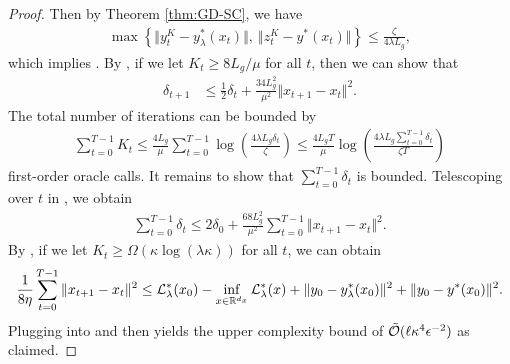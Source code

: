 \begin{proof}
Then by Theorem \ref{thm:GD-SC}, we have
\begin{align} \label{eq:induction}
     \max \left\{ \Vert y_t^K - y_{\lambda}^*(x_t) \Vert , ~\Vert z_t^K-  y^*(x_t) \Vert   \right\} \le \frac{\zeta}{4 \lambda L_g},
\end{align}
which implies . 
By , if we let $K_t \ge 8L_g/\mu$ for all $t$, then we can show that
\begin{align}  \label{eq:dekta-recur}
     \delta_{t+1}
    &\le \frac{1}{2} \delta_t +\frac{34 L_g^2}{\mu^2} \Vert x_{t+1} - x_t \Vert^2.
\end{align}
The total number of iterations can be bounded by
\begin{align} \label{plug:2}
\sum_{t=0}^{T-1} K_t \le \frac{4L_g}{\mu} \sum_{t=0}^{T-1} \log \left( 
\frac{4 \lambda L_g \delta_t}{\zeta}
\right)   \le \frac{4L_g T}{\mu} \log \left( \frac{4 \lambda L_g \sum_{t=0}^{T-1}\delta_t}{\zeta T} \right)
\end{align}
 first-order oracle calls. It remains to show that $\sum_{t=0}^{T-1} \delta_t$ is bounded.
Telescoping over $t$ in , we obtain
\begin{align} \label{plug:1}
    \sum_{t=0}^{T-1} \delta_{t} \le 2 \delta_0 + \frac{68L_g^2}{\mu^2} \sum_{t=0}^{T-1} \Vert x_{t+1} - x_t \Vert^2.
\end{align}
By , if we let $K_t \ge \Omega( \kappa \log(\lambda \kappa))$ for all $t$, we can obtain
\begin{align*}
\frac{1}{8 \eta} \sum_{t=0}^{T-1} \Vert x_{t+1} - x_t \Vert^2 \le {\mathcal{L}}_{\lambda}^*(x_0) - \inf_{x \in {\mathbb{R}}^{d_x}} {\mathcal{L}}_{\lambda}^*(x) + \Vert y_0 - y_{\lambda}^*(x_0) \Vert^2 + \Vert y_0 - y^*(x_0) \Vert^2 .
\end{align*}
Plugging into  and then  yields the upper complexity bound of $\tilde {{\mathcal{O}}}(\ell \kappa^4 \epsilon^{-2})$ as claimed. 
\end{proof}

